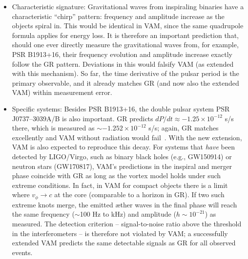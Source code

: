 \begin{itemize}
\item Characteristic signature: Gravitational waves from inspiraling binaries have a characteristic “chirp” pattern: frequency and amplitude increase as the objects spiral in. This would be identical in VAM, since the same quadrupole formula applies for energy loss. It is therefore an important prediction that, should one ever directly measure the gravitational waves from, for example, PSR B1913+16, their frequency evolution and amplitude increase exactly follow the GR pattern. Deviations in this would falsify VAM (as extended with this mechanism). So far, the time derivative of the pulsar period is the primary observable, and it already matches GR (and now also the extended VAM) within measurement error.

\item Specific systems: Besides PSR B1913+16, the double pulsar system PSR J0737–3039A/B is also important. GR predicts $dP/dt \approx -1.25\times10^{-12}$ s/s there, which is measured as $\sim-1.252\times10^{-12}$ s/s; again, GR matches excellently and VAM without radiation would fail~\cite{iskandarani2025VAM3}. With the new extension, VAM is also expected to reproduce this decay. For systems that \textit{have} been detected by LIGO/Virgo, such as binary black holes (e.g., GW150914) or neutron stars (GW170817), VAM’s predictions in the inspiral and merger phase coincide with GR as long as the vortex model holds under such extreme conditions. In fact, in VAM for compact objects there is a limit where $v_ϕ \to c$ at the core (comparable to a horizon in GR). If two such extreme knots merge, the emitted æther waves in the final phase will reach the same frequency ($\sim$100 Hz to kHz) and amplitude ($h \sim 10^{-21}$) as measured. The detection criterion – signal-to-noise ratio above the threshold in the interferometers – is therefore not violated by VAM; a successfully extended VAM predicts the same detectable signals as GR for all observed events.
\end{itemize}

